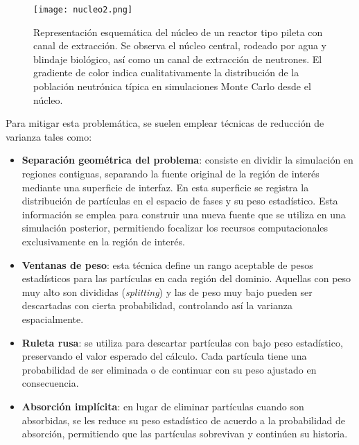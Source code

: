 \begin{figure}[H]
    \centering
    \texttt{[image: nucleo2.png]}
    \caption{Representación esquemática del núcleo de un reactor tipo pileta con canal de extracción. Se observa el núcleo central, rodeado por agua y blindaje biológico, así como un canal de extracción de neutrones. El gradiente de color indica cualitativamente la distribución de la población neutrónica típica en simulaciones Monte Carlo desde el núcleo.}
    \label{fig:nucleo2}
\end{figure}



Para mitigar esta problemática, se suelen emplear técnicas de reducción de varianza tales como:
\begin{itemize}

    \item \textbf{Separación geométrica del problema}: consiste en dividir la simulación en regiones contiguas, separando la fuente original de la región de interés mediante una superficie de interfaz. En esta superficie se registra la distribución de partículas en el espacio de fases y su peso estadístico. Esta información se emplea para construir una nueva fuente que se utiliza en una simulación posterior, permitiendo focalizar los recursos computacionales exclusivamente en la región de interés.
    
    \item \textbf{Ventanas de peso}: esta técnica define un rango aceptable de pesos estadísticos para las partículas en cada región del dominio. Aquellas con peso muy alto son divididas (\emph{splitting}) y las de peso muy bajo pueden ser descartadas con cierta probabilidad, controlando así la varianza espacialmente.
    
    \item \textbf{Ruleta rusa}: se utiliza para descartar partículas con bajo peso estadístico, preservando el valor esperado del cálculo. Cada partícula tiene una probabilidad de ser eliminada o de continuar con su peso ajustado en consecuencia.
    
    \item \textbf{Absorción implícita}: en lugar de eliminar partículas cuando son absorbidas, se les reduce su peso estadístico de acuerdo a la probabilidad de absorción, permitiendo que las partículas sobrevivan y continúen su historia.
\end{itemize}

